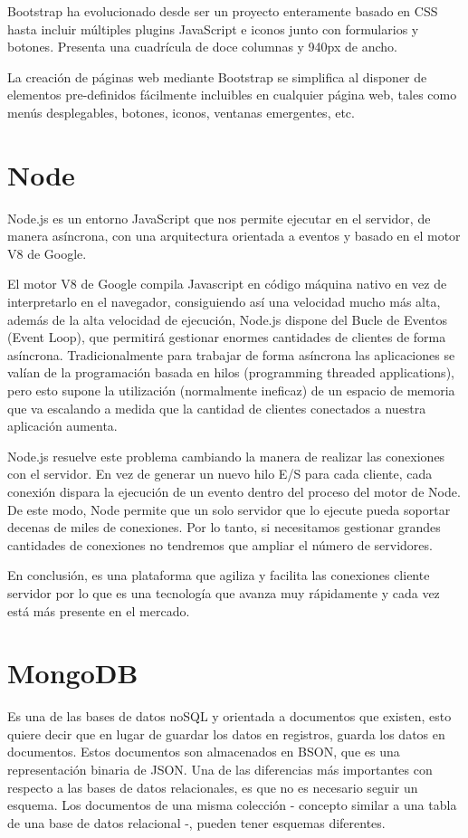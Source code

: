 \documentclass[a4paper, 12pt]{book}
\begin{document}
	Bootstrap ha evolucionado desde ser un proyecto enteramente basado en CSS hasta incluir múltiples plugins JavaScript e iconos junto con formularios y botones. Presenta una cuadrícula de doce columnas y 940px de ancho.

	La creación de páginas web mediante Bootstrap se simplifica al disponer de elementos pre-definidos fácilmente incluibles en cualquier página web, tales como menús desplegables, botones, iconos, ventanas emergentes, etc.

\section{Node} 
\label{sec:Node}
	Node.js es un entorno JavaScript que nos permite ejecutar en el servidor, de manera asíncrona, con una arquitectura orientada a eventos y basado en el motor V8 de Google.
	
	El motor V8 de Google compila Javascript en código máquina nativo en vez de interpretarlo en el navegador, consiguiendo así una velocidad mucho más alta, además de la alta velocidad de ejecución, Node.js dispone del Bucle de Eventos (Event Loop), que permitirá gestionar enormes cantidades de clientes de forma asíncrona. Tradicionalmente para trabajar de forma asíncrona las aplicaciones se valían de la programación basada en hilos (programming threaded applications), pero esto supone la utilización (normalmente ineficaz) de un espacio de memoria que va escalando a medida que la cantidad de clientes conectados a nuestra aplicación aumenta.
	
	Node.js resuelve este problema cambiando la manera de realizar las conexiones con el servidor. En vez de generar un nuevo hilo E/S para cada cliente, cada conexión dispara la ejecución de un evento dentro del proceso del motor de Node. De este modo, Node permite que un solo servidor que lo ejecute pueda soportar decenas de miles de conexiones. Por lo tanto, si necesitamos gestionar grandes cantidades de conexiones no tendremos que ampliar el número de servidores.

	En conclusión, es una plataforma que agiliza y facilita las conexiones cliente servidor por lo que es una tecnología que avanza muy rápidamente y cada vez está más presente en el mercado.

\section{MongoDB} 
\label{sec:MongoDB}

Es una de las bases de datos noSQL y orientada a documentos que existen, esto quiere decir que en lugar de guardar los datos en registros, guarda los datos en documentos. Estos documentos son almacenados en BSON, que es una representación binaria de JSON. Una de las diferencias más importantes con respecto a las bases de datos relacionales, es que no es necesario seguir un esquema. Los documentos de una misma colección - concepto similar a una tabla de una base de datos relacional -, pueden tener esquemas diferentes.
\end{document}
